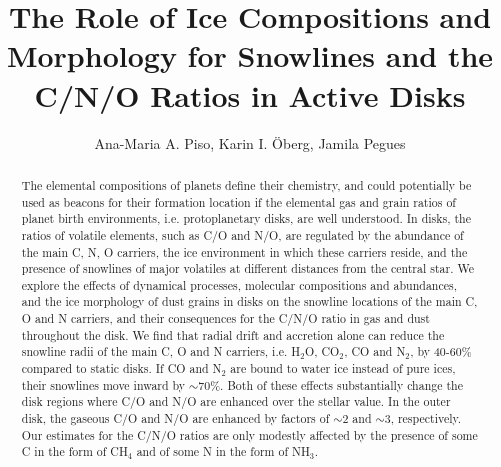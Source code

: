 \documentclass[apj]{emulateapj}
\begin{document}


\title{The Role of Ice Compositions and Morphology for Snowlines and the C/N/O Ratios in Active Disks}

\author{Ana-Maria A. Piso, Karin I. \"Oberg, Jamila Pegues}


\begin{abstract}
The elemental compositions of planets define their chemistry, and could potentially be used as beacons for their formation location if the elemental gas and grain ratios of planet birth environments, i.e. protoplanetary disks, are well understood. In disks, the ratios of volatile elements, such as C/O and N/O, are regulated by the abundance of the main C, N, O carriers, the ice environment in which these carriers reside, and the presence of snowlines of major volatiles at different distances from the central star. We explore the effects of dynamical processes, molecular compositions and abundances, and the ice morphology of dust grains in disks on the snowline locations of the main C, O and N carriers, and their consequences for the C/N/O ratio in gas and dust throughout the disk. We find that radial drift and accretion alone can reduce the snowline radii of the main C, O and N carriers, i.e. H$_2$O, CO$_2$, CO and N$_2$, by 40-60\% compared to static disks. If CO and N$_2$ are bound to water ice instead of pure ices, their snowlines move inward by $\sim$$70$\%. Both of these effects substantially change the disk regions where C/O and N/O are enhanced over the stellar value. In the outer disk, the gaseous C/O and N/O are enhanced by factors of $\sim$$2$ and $\sim$$3$, respectively. Our estimates for the C/N/O ratios are only modestly affected by the presence of some C in the form of CH$_4$ and of some N in the form of NH$_3$.  

\end{abstract}
\end{document}
